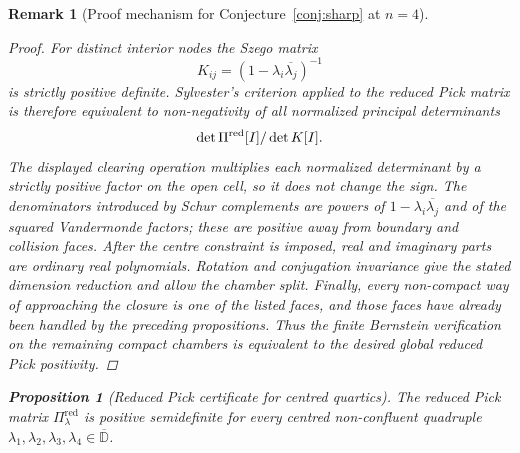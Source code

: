 \documentclass[11pt]{article}
\newtheorem{proposition}[theorem]{Proposition}
\newtheorem{remark}[theorem]{Remark}
\numberwithin{equation}{section}
\newcommand{\bbD}{\mathbb D}
\begin{document}
\begin{remark}[Proof mechanism for Conjecture~\ref{conj:sharp} at $n=4$]
\begin{proof}
For distinct interior nodes the Szego matrix
\[
  K_{ij}=(1-\lambda_i\overline{\lambda_j})^{-1}
\]
is strictly positive definite.  Sylvester's criterion applied to the reduced
Pick matrix is therefore equivalent to non-negativity of all normalized
principal determinants
\[
  \det \Pi^{\rm red}[I]/\det K[I].
\]
The displayed clearing operation multiplies each normalized determinant by a
strictly positive factor on the open cell, so it does not change the sign.
The denominators introduced by Schur complements are powers of
\(1-\lambda_i\overline{\lambda_j}\) and of the squared Vandermonde factors;
these are positive away from boundary and collision faces.  After the centre
constraint is imposed, real and imaginary parts are ordinary real polynomials.
Rotation and conjugation invariance give the stated dimension reduction and
allow the chamber split.  Finally, every non-compact way of approaching the
closure is one of the listed faces, and those faces have already been handled
by the preceding propositions.  Thus the finite Bernstein verification on the
remaining compact chambers is equivalent to the desired global reduced Pick
positivity.
\end{proof}

\begin{proposition}[Reduced Pick certificate for centred quartics]
\label{prop:interior-machine-certificate}
The reduced Pick matrix \(\Pi^{\mathrm{red}}_\lambda\) is positive semidefinite
for every centred non-confluent quadruple
\(\lambda_1,\lambda_2,\lambda_3,\lambda_4\in\overline{\bbD}\).
\end{proposition}


\end{remark}
\end{document}
